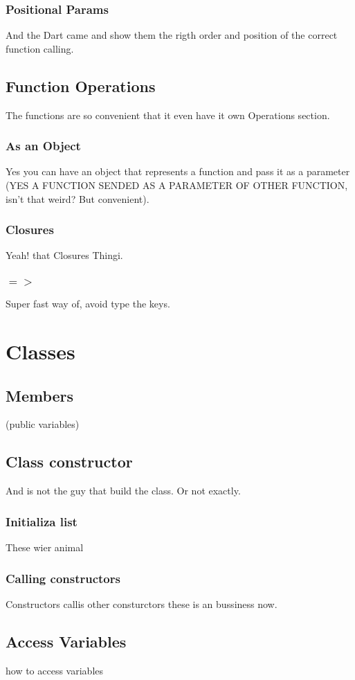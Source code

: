 \documentclass[10pt]{book}
\begin{document}
\subsubsection{Positional Params}
And the Dart came and show them the rigth order and position of the correct function calling.
\subsection{Function Operations}
The functions are so convenient that it even have it own Operations section.
\subsubsection{As an Object}
Yes you can have an object that represents a function and pass it as a parameter (YES A FUNCTION SENDED AS A PARAMETER OF OTHER FUNCTION, isn't that weird? But convenient).
\subsubsection{Closures}
Yeah! that Closures Thingi.
\subsubsection{ $=>$ }
Super fast way of, avoid type the keys.

\section{Classes}
\subsection{Members}
(public variables)
\subsection{Class constructor}
And is not the guy that build the class. Or not exactly.
\subsubsection{Initializa list}
These wier animal
\subsubsection{Calling constructors}
Constructors callis other consturctors these is an bussiness now.
\subsection{Access Variables}
how to access variables 
\end{document}
